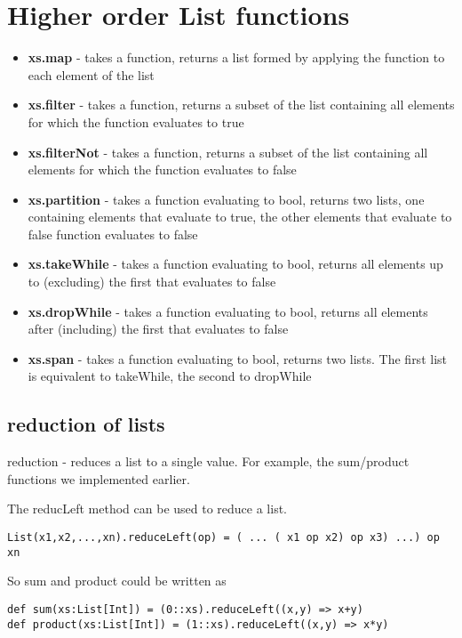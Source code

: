 \section{Higher order List functions}
\begin{itemize}
  \item \textbf{xs.map} - takes a function, returns a list formed by applying the function to each element of the list
  \item \textbf{xs.filter} - takes a function, returns a subset of the list containing all elements for which the function evaluates to true
  \item \textbf{xs.filterNot} - takes a function, returns a subset of the list containing all elements for which the function evaluates to false
  \item \textbf{xs.partition} - takes a function evaluating to bool, returns two lists, one containing elements that evaluate to true, the other elements that evaluate to false
  function evaluates to false
  \item \textbf{xs.takeWhile} - takes a function evaluating to bool, returns all elements up to (excluding) the first that evaluates to false
  \item \textbf{xs.dropWhile} - takes a function evaluating to bool, returns all elements after (including) the first that evaluates to false
  \item \textbf{xs.span} - takes a function evaluating to bool, returns two lists. The first list is equivalent to takeWhile, the second to dropWhile
\end{itemize}

\subsection{reduction of lists}
reduction - reduces a list to a single value. For example, the sum/product functions we implemented earlier.

The reducLeft method can be used to reduce a list. 
\begin{lstlisting}
List(x1,x2,...,xn).reduceLeft(op) = ( ... ( x1 op x2) op x3) ...) op xn
\end{lstlisting}

So sum and product could be written as 

\begin{lstlisting}
def sum(xs:List[Int]) = (0::xs).reduceLeft((x,y) => x+y)
def product(xs:List[Int]) = (1::xs).reduceLeft((x,y) => x*y)
\end{lstlisting}

